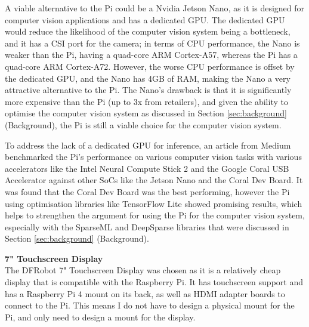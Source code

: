 A viable alternative to the Pi could be a Nvidia Jetson Nano\cite{jetsonnano}, as it is designed for computer vision applications and has a dedicated GPU. The dedicated GPU
would reduce the likelihood of the computer vision system being a bottleneck, and it has a CSI port for the camera; in terms of CPU performance, the Nano is weaker than the Pi,
having a quad-core ARM Cortex-A57, whereas the Pi has a quad-core ARM Cortex-A72\cite{pi4}. However, the worse CPU performance is offset by the dedicated GPU, and the Nano has 4GB of RAM, 
making the Nano a very attractive alternative to the Pi. The Nano's drawback is that it is significantly more expensive than the Pi (up to 3x from retailers), and
given the ability to optimise the computer vision system as discussed in Section \ref*{sec:background} (Background), the Pi is still
a viable choice for the computer vision system.

To address the lack of a dedicated GPU for inference, an article from Medium\cite{benchmarks} benchmarked the Pi's performance on various computer vision tasks with 
various accelerators like the Intel Neural Compute Stick 2 and the Google Coral USB Accelerator against other SoCs like the Jetson Nano and the Coral Dev Board. 
It was found that the Coral Dev Board was the best performing, however the Pi using optimisation libraries like TensorFlow Lite showed  promising results, which
helps to strengthen the argument for using the Pi for the computer vision system, especially with the SparseML and DeepSparse libraries that were discussed in Section \ref*{sec:background} (Background).

\vspace{1em}
\noindent
\textbf{7" Touchscreen Display} \\
The DFRobot 7" Touchscreen Display was chosen as it is a relatively cheap display that is compatible with the Raspberry Pi.
It has touchscreen support and has a Raspberry Pi 4 mount on its back, as well as HDMI adapter boards to connect to the Pi.
This means I do not have to design a physical mount for the Pi, and only need to design a mount for the display.

